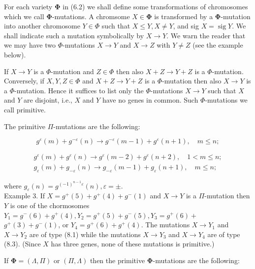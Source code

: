 \documentclass[10pt]{article}
\begin{document}
For each variety $\boldsymbol{\Phi}$ in (6.2) we shall define some transformations of chromosomes which we call $\boldsymbol{\Phi}$-mutations. A chromsome $X \in \boldsymbol{\Phi}$ is transformed by a $\boldsymbol{\Phi}$-mutation into another chromosome $Y \in \Phi$ such that $X \leqslant Y, X \neq Y$, and sig $X=\operatorname{sig} Y$. We shall indicate such a mutation symbolically by $X \rightarrow Y$. We warn the reader that we may have two $\Phi$-mutations $X \rightarrow Y$ and $X \rightarrow Z$ with $Y \neq Z$ (see the example below).

If $X \rightarrow Y$ is a $\Phi$-mutation and $Z \in \Phi$ then also $X+Z \rightarrow Y+Z$ is a $\Phi$-mutation. Conversely, if $X, Y, Z \in \Phi$ and $X+Z \rightarrow Y+Z$ is a $\Phi$-mutation then also $X \rightarrow Y$ is a $\Phi$-mutation. Hence it suffices to list only the $\Phi$-mutations $X \rightarrow Y$ such that $X$ and $Y$ are disjoint, i.e., $X$ and $Y$ have no genes in common. Such $\Phi$-mutations we call primitive.

The primitive $\Pi$-mutations are the following:


\begin{equation*}
g^{\varepsilon}(m)+g^{-\varepsilon}(n) \rightarrow g^{-\varepsilon}(m-1)+g^{\varepsilon}(n+1), \quad m \leqslant n ; \tag{8.1}
\end{equation*}



\begin{gather*}
g^{\varepsilon}(m)+g^{\varepsilon}(n) \rightarrow g^{\varepsilon}(m-2)+g^{\varepsilon}(n+2), \quad 1<m \leqslant n ;  \tag{8.2}\\
g_{\varepsilon}(m)+g_{-\varepsilon}(n) \rightarrow g_{-\varepsilon}(m-1)+g_{\varepsilon}(n+1), \quad m \leqslant n ; \tag{8.3}
\end{gather*}


where $g_{\varepsilon}(n)=g^{(-1)^{n-1} \varepsilon}(n), \varepsilon= \pm$.\\
Example 3. If $X=g^{+}(5)+g^{+}(4)+g^{-}(1)$ and $X \rightarrow Y$ is a $\Pi$-mutation then $Y$ is one of the chormosomes $Y_{1}=g^{-}(6)+g^{+}(4), Y_{2}=g^{+}(5)+g^{-}(5), Y_{3}=g^{+}(6)+$ $g^{+}(3)+g^{-}(1)$, or $Y_{4}=g^{+}(6)+g^{+}(4)$. The mutations $X \rightarrow Y_{1}$ and $X \rightarrow Y_{2}$ are of type (8.1) while the mutations $X \rightarrow Y_{3}$ and $X \rightarrow Y_{4}$ are of type (8.3). (Since $X$ has three genes, none of these mutations is primitive.)

If $\boldsymbol{\Phi}=(\Lambda, \Pi)$ or $(\Pi, \Lambda)$ then the primitive $\boldsymbol{\Phi}$-mutations are the following:
\end{document}
